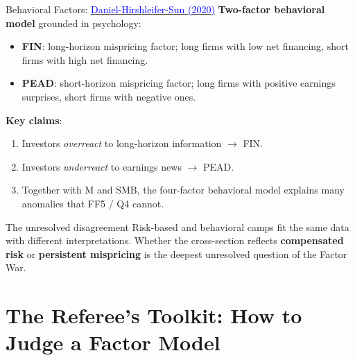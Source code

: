 \documentclass{beamer}
\begin{document}
\begin{frame}{Behavioral Factors: \href{https://doi.org/10.1093/rfs/hhz069}{\textcolor{blue}{Daniel-Hirshleifer-Sun (2020)}}}
	\textbf{Two-factor behavioral model} grounded in psychology:
	\begin{itemize}
		\item \textbf{FIN}: long-horizon mispricing factor; long firms with low net financing, short firms with high net financing.
		\item \textbf{PEAD}: short-horizon mispricing factor; long firms with positive earnings surprises, short firms with negative ones.
	\end{itemize}
	\vspace{4pt}
	\textbf{Key claims}:
	\begin{enumerate}
		\item Investors \textit{overreact} to long-horizon information $\rightarrow$ FIN.
		\item Investors \textit{underreact} to earnings news $\rightarrow$ PEAD.
		\item Together with M and SMB, the four-factor behavioral model explains many anomalies that FF5 / Q4 cannot.
	\end{enumerate}
	\vspace{4pt}
	\begin{block}{The unresolved disagreement}
		Risk-based and behavioral camps fit the same data with different interpretations. Whether the cross-section reflects \textbf{compensated risk} or \textbf{persistent mispricing} is the deepest unresolved question of the Factor War.
	\end{block}
\end{frame}

\section{The Referee's Toolkit: How to Judge a Factor Model}
\end{document}
